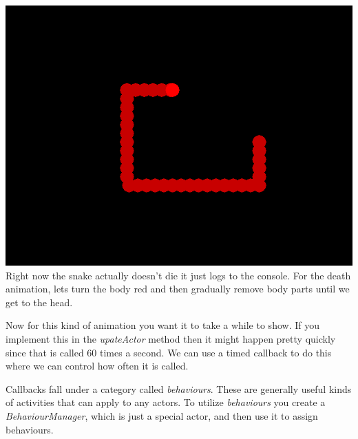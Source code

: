 \documentclass[letterpaper,10pt,english]{sphinxmanual}
\begin{document}
\includegraphics{ss-1-death.png}
Right now the snake actually doesn't die it just logs to the console. For the death animation, lets
turn the body red and then gradually remove body parts until we get to the head.

Now for this kind of animation you want it to take a while to show. If you implement this in the
\emph{upateActor} method then it might happen pretty quickly since that is called 60 times a second.
We can use a timed callback to do this where we can control how often it is called.

Callbacks fall under a category called \emph{behaviours}. These are generally useful kinds of activities
that can apply to any actors. To utilize \emph{behaviours} you create a \emph{BehaviourManager}, which is just
a special actor, and then use it to assign behaviours.
\end{document}
